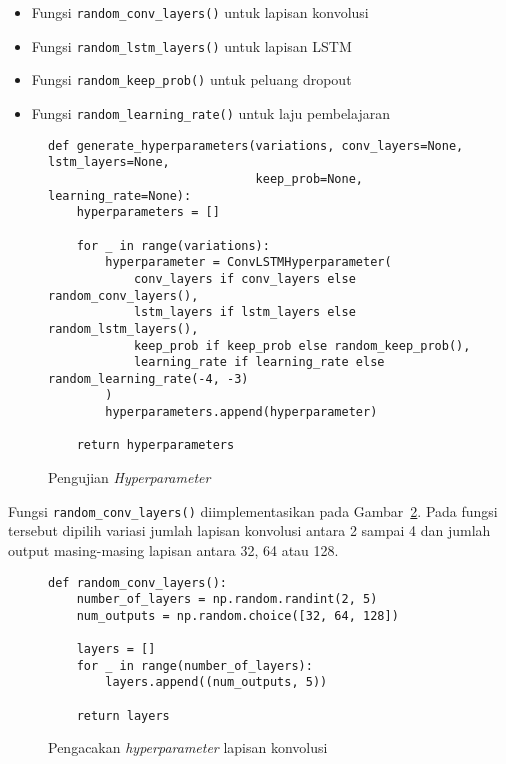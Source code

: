 \begin{itemize}
    \item Fungsi \texttt{random_conv_layers()} untuk lapisan konvolusi
    \item Fungsi \texttt{random_lstm_layers()} untuk lapisan LSTM
    \item Fungsi \texttt{random_keep_prob()} untuk peluang dropout
    \item Fungsi \texttt{random_learning_rate()} untuk laju pembelajaran
\end{itemize}

\begin{figure}[h]
\begin{verbatim}
def generate_hyperparameters(variations, conv_layers=None, lstm_layers=None,
                             keep_prob=None, learning_rate=None):
    hyperparameters = []

    for _ in range(variations):
        hyperparameter = ConvLSTMHyperparameter(
            conv_layers if conv_layers else random_conv_layers(),
            lstm_layers if lstm_layers else random_lstm_layers(),
            keep_prob if keep_prob else random_keep_prob(),
            learning_rate if learning_rate else random_learning_rate(-4, -3)
        )
        hyperparameters.append(hyperparameter)

    return hyperparameters
\end{verbatim}
\caption{Pengujian \textit{Hyperparameter}}
\label{listing:har-generate-hyperparameter}
\end{figure}

Fungsi \texttt{random_conv_layers()} diimplementasikan pada Gambar~\ref{listing:har-random-conv-layers}. Pada fungsi tersebut dipilih variasi jumlah lapisan konvolusi antara 2 sampai 4 dan jumlah output masing-masing lapisan antara 32, 64 atau 128.

\begin{figure}[h]
\begin{verbatim}
def random_conv_layers():
    number_of_layers = np.random.randint(2, 5)
    num_outputs = np.random.choice([32, 64, 128])

    layers = []
    for _ in range(number_of_layers):
        layers.append((num_outputs, 5))

    return layers
\end{verbatim}
\caption{Pengacakan \textit{hyperparameter} lapisan konvolusi}
\label{listing:har-random-conv-layers}
\end{figure}

